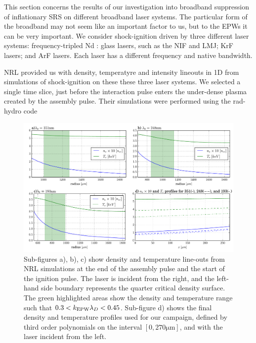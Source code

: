 This section concerns the results of our investigation into broadband suppression of inflationary SRS on different broadband laser systems. The particular form of the broadband may not seem like an important factor to us, but to the EPWs it can be very important.
We consider shock-ignition driven by three different laser systems: frequency-tripled Nd : glass lasers, such as the NIF and LMJ; KrF lasers; and ArF lasers. Each laser has a different frequency and native bandwidth. 

NRL provided us with density, temperatyre and intensity lineouts in 1D from simulations of shock-ignition on these these three laser systems. We selected a single time slice, just before the interaction pulse enters the under-dense plasma created by the assembly pulse. Their simulations were performed using the rad-hydro code 

\begin{figure}[ht]
   \centering
    \includegraphics[width=\columnwidth]{Chapters/C5_broadband/a_b_c_d_Dens_temp.pdf}
    \caption{Sub-figures a), b), c) show density and temperature line-outs from NRL simulations at the end of the assembly pulse and the start of the ignition pulse. The laser is incident from the right, and the left-hand side boundary represents the quarter critical density surface. The green highlighted areas show the density and temperature range such that $0.3<k_\mathrm{EPW}\lambda_D<0.45$. Sub-figure d) shows the final density and temperature profiles used for our campaign, defined by third order polynomials on the interval $[0,270\si{\micro\metre}]$, and with the laser incident from the left.}
    \label{fig:dens_temp}
\end{figure}{}


